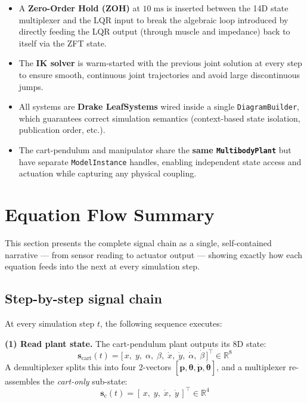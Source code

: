 \documentclass[11pt, a4paper]{article}
\begin{document}
\begin{itemize}
  \item A \textbf{Zero-Order Hold (ZOH)} at $10\;\mathrm{ms}$ is inserted
        between the 14D state multiplexer and the LQR input to break the
        algebraic loop introduced by directly feeding the LQR output (through
        muscle and impedance) back to itself via the ZFT state.

  \item The \textbf{IK solver} is warm-started with the previous joint
        solution at every step to ensure smooth, continuous joint trajectories
        and avoid large discontinuous jumps.

  \item All systems are \textbf{Drake LeafSystems} wired inside a single
        \texttt{DiagramBuilder}, which guarantees correct simulation semantics
        (context-based state isolation, publication order, etc.).

  \item The cart-pendulum and manipulator share the \textbf{same
        \texttt{MultibodyPlant}} but have separate \texttt{ModelInstance}
        handles, enabling independent state access and actuation while
        capturing any physical coupling.
\end{itemize}

\newpage
\section{Equation Flow Summary}

This section presents the complete signal chain as a single, self-contained
narrative — from sensor reading to actuator output — showing exactly how each
equation feeds into the next at every simulation step.

\subsection*{Step-by-step signal chain}

\noindent At every simulation step $t$, the following sequence executes:

\bigskip
\noindent\textbf{(1) Read plant state.}
The cart-pendulum plant outputs its 8D state:
\[
\bm{s}_{\mathrm{cart}}(t)
= \bigl[\,x,\;y,\;\alpha,\;\beta,\;\dot{x},\;\dot{y},\;\dot{\alpha},\;\dot{\beta}\,\bigr]^{\!\top}
\in\mathbb{R}^8
\]
A demultiplexer splits this into four 2-vectors
$[\bm{p}, \bm{\theta}, \dot{\bm{p}}, \dot{\bm{\theta}}]$,
and a multiplexer re-assembles the \emph{cart-only} sub-state:
\[
\bm{s}_{\mathrm{c}}(t) = [\,x,\;y,\;\dot{x},\;\dot{y}\,]^{\!\top} \in\mathbb{R}^4
\]
\end{document}
